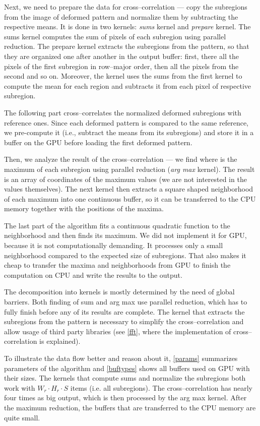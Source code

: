 Next, we need to prepare the data for cross--correlation --- copy the subregions from the image of deformed pattern and normalize them by subtracting the respective means. It is done in two kernels: \emph{sums} kernel and \emph{prepare} kernel. The sums kernel computes the sum of pixels of each subregion using parallel reduction. The prepare kernel extracts the subregions from the pattern, so that they are organized one after another in the output buffer: first, there all the pixels of the first subregion in row--major order, then all the pixels from the second and so on. Moreover, the kernel uses the sums from the first kernel to compute the mean for each region and subtracts it from each pixel of respective subregion.

The following part cross--correlates the normalized deformed subregions with reference ones. Since each deformed pattern is compared to the same reference, we pre-compute it (i.e., subtract the means from its subregions) and store it in a buffer on the GPU before loading the first deformed pattern.

Then, we analyze the result of the cross--correlation --- we find where is the maximum of each subregion using parallel reduction (\emph{arg max} kernel). The result is an array of coordinates of the maximum values (we are not interested in the values themselves). The next kernel then extracts a square shaped neighborhood of each maximum into one continuous buffer, so it can be transferred to the CPU memory together with the positions of the maxima.

The last part of the algorithm fits a continuous quadratic function to the neighborhood and then finds its maximum. We did not implement it for GPU, because it is not computationally demanding. It processes only a small neighborhood compared to the expected size of subregions. That also makes it cheap to transfer the maxima and neighborhoods from GPU to finish the computation on CPU and write the results to the output.

The decomposition into kernels is mostly determined by the need of global barriers. Both finding of sum and arg max use parallel reduction, which has to fully finish before any of its results are complete. The kernel that extracts the subregions from the pattern is necessary to simplify the cross--correlation and allow usage of third party libraries (see \cref{fft}, where the implementation of cross--correlation is explained).

To illustrate the data flow better and reason about it, \cref{params} summarizes parameters of the algorithm and \cref{buftypes} shows all buffers used on GPU with their sizes. The kernels that compute sums and normalize the subregions both work with $W_r \cdot H_r \cdot S$ items (i.e. all subregions). The cross--correlation has nearly four times as big output, which is then processed by the arg max kernel. After the maximum reduction, the buffers that are transferred to the CPU memory are quite small.

